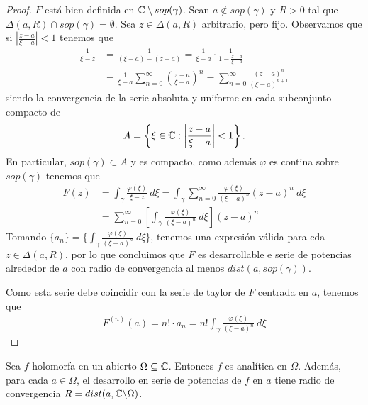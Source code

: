 \begin{proof}
    $F$ está bien definida en $\mathbb{C} \setminus sop(\gamma)$. Sean $a \not \in sop(\gamma)$ y $R > 0$ tal que $\Delta(a,R) \cap sop(\gamma) = \emptyset$. Sea $z \in \Delta(a,R)$ arbitrario, pero fijo. Observamos que si $\left| \frac{z-a}{\xi - a} \right| < 1$ tenemos que
    \begin{align*}
        \frac{1}{\xi - z} & = \frac{1}{(\xi - a) - (z - a)} = \frac{1}{\xi - a} \cdot \frac{1}{1 - \frac{z-a}{\xi - a}}                                       \\
                          & = \frac{1}{\xi - a} \sum_{n=0}^{\infty}{\left( \frac{z-a}{\xi -a}\right)^n} = \sum_{n=0}^{\infty}{\frac{(z-a)^n}{(\xi -a)^{n+1}}}
    \end{align*}
    siendo la convergencia de la serie absoluta y uniforme en cada subconjunto compacto de
    \begin{align*}
        A = \left\{ \xi \in \mathbb{C} : \left| \frac{z-a}{\xi - a} \right| < 1 \right\}.
    \end{align*}
    En particular, $sop(\gamma) \subset A$ y es compacto, como además $\varphi$ es contina sobre $sop(\gamma)$ tenemos que
    \begin{align*}
        F(z) & = \int_{\gamma}{\frac{\varphi(\xi)}{\xi - z} \ d\xi} = \int_{\gamma}{\sum_{n=0}^{\infty}{\frac{\varphi(\xi)}{(\xi - a)^{n}}}(z-a)^{n} \ d\xi} \\
             & = {\sum_{n=0}^{\infty}{\left[\int_{\gamma}\frac{\varphi(\xi)}{(\xi - a)^{n}} \ d\xi \right]}(z-a)^{n} }
    \end{align*}
    Tomando $\{a_n\} = \{\int_{\gamma}\frac{\varphi(\xi)}{(\xi - a)^{n}} \ d\xi \} $, tenemos una expresión válida para cda $z \in \Delta(a,R)$, por lo que concluimos que $F$ es desarrollable e serie de potencias alrededor de $a$ con radio de convergencia al menos $dist(a,sop(\gamma))$.

    Como esta serie debe coincidir con la serie de taylor de $F$ centrada en $a$, tenemos que
    \begin{align*}
        F^{(n)}(a) = n! \cdot a_n = n!\int_{\gamma}\frac{\varphi(\xi)}{(\xi - a)^{n}} \ d\xi
    \end{align*}
\end{proof}

\begin{teo}
    Sea $f$ holomorfa en un abierto $\Omega \subseteq \mathbb{C}$. Entonces $f$ es analítica en $\Omega$. Además, para cada $a \in \Omega$, el desarrollo en serie de potencias de $f$ en $a$ tiene radio de convergencia $R = dist(a, \mathbb{C} \backslash \Omega)$.
\end{teo}

